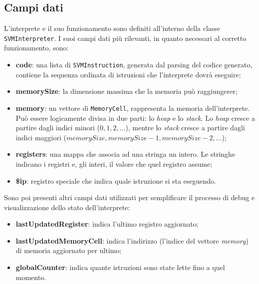 \documentclass[../main.tex]{subfiles}
\begin{document}
\subsection{Campi dati}
L'interprete e il suo funzionamento sono definiti all'interno della classe \verb|SVMInterpreter|. I suoi campi dati pi\`u rilevanti, in quanto necessari al corretto funzionamento, sono:
\begin{itemize}
    \item \textbf{code}: una lista di \verb|SVMInstruction|, generata dal parsing del codice generato, contiene la sequenza ordinata di istruzioni che l'interprete dovr\`a eseguire;
    \item \textbf{memorySize}: la dimensione massima che la memoria pu\`o raggiungerer;
    \item \textbf{memory}: un vettore di \verb|MemoryCell|, rappresenta la memoria dell'interprete. Pu\`o essere logicamente divisa in due parti: lo \textit{heap} e lo \textit{stack}. Lo \textit{heap} cresce a partire dagli indici minori ($0, 1, 2, \dots$), mentre lo \textit{stack} cresce a partire dagli indici maggiori ($memorySize, memorySize - 1, memorySize - 2, \dots$);
    \item \textbf{registers}: una mappa che associa ad una stringa un intero. Le stringhe indicano i registri e, gli interi, il valore che quel registro assume;
    \item \textbf{\$ip}: registro speciale che indica quale istruzione si sta eseguendo. 
\end{itemize} 
Sono poi presenti altri campi dati utilizzati per semplificare il processo di debug e visualizzazione dello stato dell'interprete:
\begin{itemize}
    \item \textbf{lastUpdatedRegister}: indica l'ultimo registro aggiornato;
    \item \textbf{lastUpdatedMemoryCell}: indica l'indirizzo (l'indice del vettore \textit{memory}) di memoria aggiornato per ultimo;
    \item \textbf{globalCounter}: indica quante istruzioni sono state lette fino a quel momento.
\end{itemize}
\end{document}
